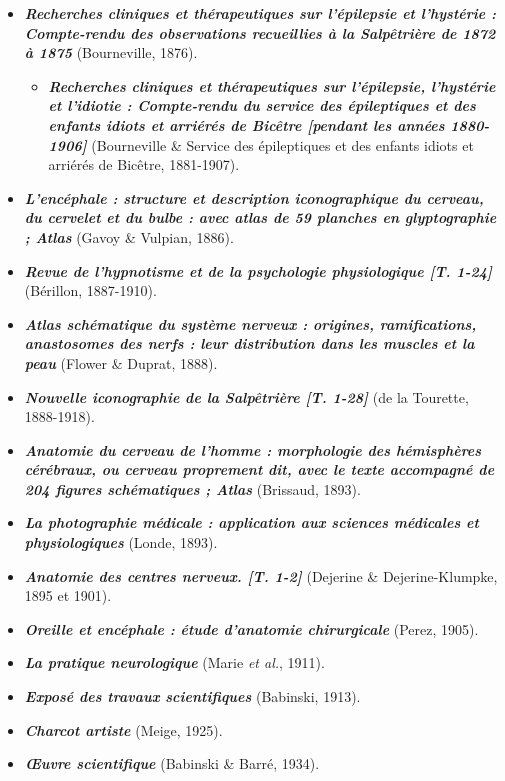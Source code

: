 \begin{itemize}
	\item \textbf{\textit{Recherches cliniques et thérapeutiques sur l'épilepsie et l'hystérie : Compte-rendu des observations recueillies à la Salpêtrière de 1872 à 1875}} (Bourneville, 1876).
	\begin{itemize}
			\item \textbf{\textit{Recherches cliniques et thérapeutiques sur l'épilepsie, l'hystérie et l'idiotie : Compte-rendu du service des épileptiques et des enfants idiots et arriérés de Bicêtre [pendant les années 1880-1906]}} (Bourneville \& Service des épileptiques et des enfants idiots et arriérés de Bicêtre, 1881-1907).
	\end{itemize}
	\item \textbf{\textit{L'encéphale : structure et description iconographique du cerveau, du cervelet et du bulbe : avec atlas de 59 planches en glyptographie ; Atlas}} (Gavoy \& Vulpian, 1886).
	\item \textbf{\textit{Revue de l'hypnotisme et de la psychologie physiologique [T. 1-24]}} (Bérillon, 1887-1910).
	\item \textbf{\textit{Atlas schématique du système nerveux : origines, ramifications, anastosomes des nerfs : leur distribution dans les muscles et la peau}} (Flower \& Duprat, 1888).
	\item \textbf{\textit{Nouvelle iconographie de la Salpêtrière [T. 1-28]}} (de la Tourette, 1888-1918).
	\item \textbf{\textit{Anatomie du cerveau de l'homme : morphologie des hémisphères cérébraux, ou cerveau proprement dit, avec le texte accompagné de 204 figures schématiques ; Atlas}} (Brissaud, 1893).
	\item \textbf{\textit{La photographie médicale : application aux sciences médicales et physiologiques}} (Londe, 1893).
	\item \textbf{\textit{Anatomie des centres nerveux. [T. 1-2]}} (Dejerine \& Dejerine-Klumpke, 1895 et 1901).
	\item \textbf{\textit{Oreille et encéphale : étude d'anatomie chirurgicale}} (Perez, 1905).
	\item \textbf{\textit{La pratique neurologique}} (Marie \textit{et al.}, 1911).
	\item \textbf{\textit{Exposé des travaux scientifiques}} (Babinski, 1913).
	\item \textbf{\textit{Charcot artiste}} (Meige, 1925).
	\item \textbf{\textit{\OE{}uvre scientifique}} (Babinski \& Barré, 1934).
\end{itemize}
\bigskip



